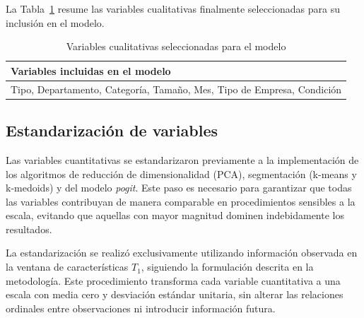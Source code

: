         La Tabla~\ref{tab:vars_cualitativas_finales} resume las variables cualitativas finalmente seleccionadas para su inclusión en el modelo.
        
        \begin{table}[H]
        \centering
        \caption{Variables cualitativas seleccionadas para el modelo}
        \label{tab:vars_cualitativas_finales}
        \begin{tabular}{p{14cm}}
        \hline
        \textbf{Variables incluidas en el modelo} \\
        \hline
        Tipo, Departamento, Categoría, Tamaño, Mes, Tipo de Empresa, Condición \\
        \hline
        \end{tabular}
        \end{table}
        
\subsection{Estandarización de variables}

    Las variables cuantitativas se estandarizaron previamente a la implementación de los algoritmos de reducción de dimensionalidad (PCA), segmentación (k-means y k-medoids) y del modelo \emph{pogit}. Este paso es necesario para garantizar que todas las variables contribuyan de manera comparable en procedimientos sensibles a la escala, evitando que aquellas con mayor magnitud dominen indebidamente los resultados.
    
    La estandarización se realizó exclusivamente utilizando información observada en la ventana de características \(T_1\), siguiendo la formulación descrita en la metodología. Este procedimiento transforma cada variable cuantitativa a una escala con media cero y desviación estándar unitaria, sin alterar las relaciones ordinales entre observaciones ni introducir información futura.

